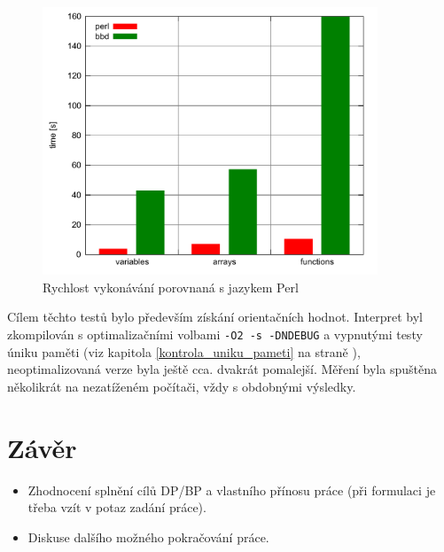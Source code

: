 \documentclass[11pt,twoside,a4paper]{book}
\begin{document}
\begin{figure}[ht]
\begin{center}
\includegraphics[width=10cm]{img/benchmark.pdf}
\caption{Rychlost vykonávání porovnaná s jazykem Perl}
\label{fig:benchmark}
\end{center}
\end{figure}

Cílem těchto testů bylo především získání orientačních hodnot. Interpret byl zkompilován s optimalizačními volbami \texttt{-O2 -s -DNDEBUG} a vypnutými testy úniku paměti (viz kapitola \ref{kontrola_uniku_pameti} na straně \pageref{kontrola_uniku_pameti}), neoptimalizovaná verze byla ještě cca. dvakrát pomalejší. Měření byla spuštěna několikrát na nezatíženém počítači, vždy s obdobnými výsledky.





\chapter{Závěr}

\begin{itemize}
\item Zhodnocení splnění cílů DP/BP a  vlastního přínosu práce (při formulaci je třeba vzít v potaz zadání práce).
\item Diskuse dalšího možného pokračování práce.
\end{itemize}


\end{document}
